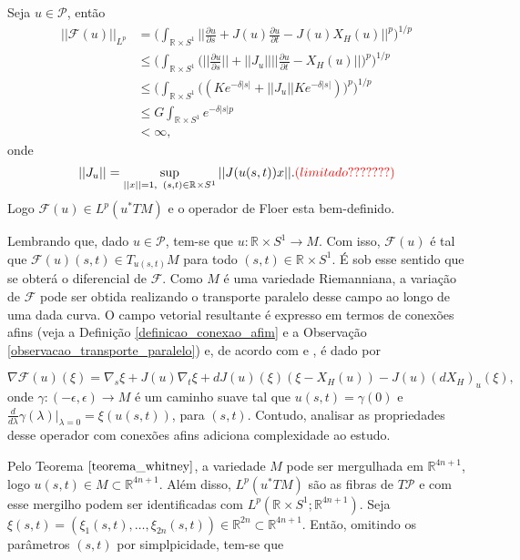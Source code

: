 \documentclass[12pt]{book}
\newcommand{\bigparenteses}[1]{\Big( #1 \Big) }
\newcommand{\caminhosexponenciaisconectantesabrev}{\mathcal{P}}
\newcommand{\circulo}{S^{1}}
\newcommand{\derivada}[2]{\frac{d #1}{d #2}}
\newcommand{\derivadaparcial}[2]{\frac{\partial #1}{\partial #2}}
\newcommand{\espacoLp}[1]{L^{p}(#1)}
\newcommand{\espacoLpcontradominio}[2]{L^{p}(#1;#2)}
\newcommand{\espacotangenteponto}[2]{T_{#1}#2}
\newcommand{\operadorFloer}{\mathcal{F}}
\newcommand{\operadorFloerDefinicao}[1]{\derivadaparcial{#1}{s} + J(#1)\derivadaparcial{#1}{t} - J(#1)X_{H}(#1)}
\newcommand{\operadorFloerParametro}[1]{\mathcal{F}(#1)}
\newcommand{\operadorFloerPadrao}{\operadorFloerParametro{u}}
\newcommand{\norma}[1]{||#1||}
\newcommand{\normagrande}[1]{\Big|\Big|#1\Big|\Big|}
\newcommand{\normaLp}[1]{||#1||_{L^{p}}}
\newcommand{\normaLpdefinicao}[2]{ \Big(\int_{#2}#1^{p}\Big)^{1/p}}
\newcommand{\normagrandeLpdefinicao}[2]{ \normaLpdefinicao{\normagrande{#1}}{#2}}
\newcommand{\pullbackfibradotangente}[2]{#1^{*}T#2}
\newcommand{\pullbackfibradotangenteM}[1]{\pullbackfibradotangente{#1}{M}}
\newcommand{\pullbackfibradotangenteMpadrao}{\pullbackfibradotangente{u}{M}}
\newcommand{\retacartesianocirculo}{\real{} \times \circulo}
\newcommand{\real}[1]{\mathbb{R}^{#1}}
\newcommand{\vermelho}[1]{{\color{red}#1}}
\begin{document}
	Seja $u \in \caminhosexponenciaisconectantesabrev$, então
	$$
	\begin{aligned}
	\normaLp{\operadorFloerPadrao} &= \normagrandeLpdefinicao{\operadorFloerDefinicao{u}}{\retacartesianocirculo}
	\\
	&\leq \normaLpdefinicao{\bigparenteses{\normagrande{\derivadaparcial{u}{s}} +\norma{J_{u}}\normagrande{\derivadaparcial{u}{t} - X_{H}(u)}}}{\retacartesianocirculo}
	\\
	&\leq \normaLpdefinicao{\bigparenteses{(Ke^{-\delta|s|} +\norma{J_{u}}Ke^{-\delta|s|})}}{\retacartesianocirculo}
	\\
	&\leq G \int_{\retacartesianocirculo}e^{-\delta|s|p}
	\\
	&< \infty,
	\end{aligned}	
	$$ 
	onde 
	$$
	\norma{J_{u}}=\sup_{\norma{x}=1, \;\; (s,t)\in \retacartesianocirculo}  \norma{J(u(s,t))x}.\vermelho{(limitado???????)}
	$$
	Logo $\operadorFloerParametro{u} \in L^{p}(\pullbackfibradotangenteMpadrao)$ e o operador de Floer esta bem-definido.
	
	Lembrando que, dado $u \in \caminhosexponenciaisconectantesabrev$, tem-se que $u:\retacartesianocirculo\to M$. Com isso, $\operadorFloerParametro{u}$ é tal que $\operadorFloerParametro{u}(s, t) \in \espacotangenteponto{u(s,t)}{M}$ para todo $(s,t)\in \retacartesianocirculo$. É sob esse sentido que se obterá o diferencial de $\operadorFloer$. Como $M$ é uma variedade Riemanniana, a variação de $\operadorFloer$ pode ser obtida realizando o transporte paralelo desse campo ao longo de uma dada curva. O campo vetorial resultante é expresso em termos de conexões afins (veja a Definição \ref{definicao_conexao_afim} e a Observação \ref{observacao_transporte_paralelo}) e, de acordo com \cite{salamon_zehnder} e \cite{salamon_lecture}, é dado por
	
	$$
	\nabla\operadorFloerParametro{u}(\xi) = \nabla_{s}\xi + J(u)\nabla_{t}\xi + dJ(u)(\xi)(\xi - X_{H}(u)) - J(u)(dX_{H})_{u}(\xi),
	$$
	onde $\gamma: (-\epsilon, \epsilon) \to M$ é um caminho suave tal que $u(s,t) =\gamma(0)$ e $\derivada{}{\lambda}\gamma(\lambda)|_{\lambda=0}=\xi(u(s,t))$, para $(s,t)$. Contudo, analisar as propriedades desse operador com conexões afins adiciona complexidade ao estudo. 
	
	Pelo Teorema $\ref{teorema_whitney}$, a variedade $M$ pode ser mergulhada em $\real{4n+1}$, logo $u(s,t)\in M \subset \real{4n+1}$. Além disso, $\espacoLp{\pullbackfibradotangenteM{u}}$ são as fibras de $T\caminhosexponenciaisconectantesabrev$ e com esse mergilho podem ser identificadas com $\espacoLpcontradominio{\retacartesianocirculo}{\real{4n+1}}$. Seja $\xi(s,t)=(\xi_{1}(s,t), \dots, \xi_{2n}(s,t)) \in \real{2n }\subset \real{4n+1}$. Então, omitindo os parâmetros $(s,t)$ por simplpicidade, tem-se que
	
\end{document}
